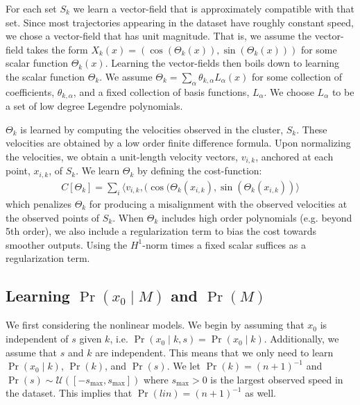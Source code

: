 \documentclass[letterpaper,10pt,conference]{ieeeconf}
\begin{document}
  For each set $S_k$ we learn a vector-field that is approximately compatible with that set.
  Since most trajectories appearing in the dataset have roughly constant speed, we chose a vector-field that has unit magnitude. 
  That is, we assume the vector-field takes the form $X_k(x) = \left( \cos( \Theta_k(x) ) , \sin(\Theta_k(x)) \right)$ for some scalar function $\Theta_k(x)$.
  Learning the vector-fields then boils down to learning the scalar function $\Theta_k$.
  We assume $\Theta_k = \sum_{\alpha} \theta_{k,\alpha} L_{\alpha}(x)$ for some collection of coefficients, $\theta_{k,\alpha}$, and a fixed collection of basis functions, $L_{\alpha}$.
  We choose $L_{\alpha}$ to be a set of low degree Legendre polynomials.
 
 $\Theta_k$ is learned by computing the velocities observed in the cluster, $S_k$.
  These velocities are obtained by a low order finite difference formula.
  Upon normalizing the velocities, we obtain a unit-length velocity vectors, $v_{i,k}$, anchored at each point, $x_{i,k}$, of $S_k$.
  We learn $\Theta_k$ by defining the cost-function:
  \begin{align}
  	C[ \Theta_k] = \sum_i \langle v_{i,k} , ( \cos(\Theta_k( x_{i,k}) , \sin( \Theta_k( x_{i,k} ) ) \rangle
  \end{align}
  which penalizes $\Theta_k$ for producing a misalignment with the observed velocities at the observed points of $S_k$.
  When $\Theta_{k}$ includes high order polynomials (e.g. beyond 5th order), we also include a regularization term to bias the cost towards smoother outputs.
  Using the $H^1$-norm times a fixed scalar suffices as a regularization term. 
  
  \subsection{Learning $\Pr( x_0 \mid M)$ and $\Pr(M)$}
  
We first considering the nonlinear models.
  We begin by assuming that $x_0$ is independent of $s$ given $k$, i.e. $\Pr( x_0 \mid k,s) = \Pr(x_0 \mid k)$.
  Additionally, we assume that $s$ and $k$ are independent.
  This means that we only need to learn $\Pr( x_0 \mid k)$, $\Pr(k)$, and $\Pr(s)$.
  We let $\Pr(k) = (n+1)^{-1}$ and $\Pr(s) \sim \mathcal{U}( [-s_{\max}, s_{\max} ] )$  where $s_{\max}>0$ is the largest observed speed in the dataset.  
  This implies that $\Pr(lin) = (n+1)^{-1}$ as well.
  
\end{document}
